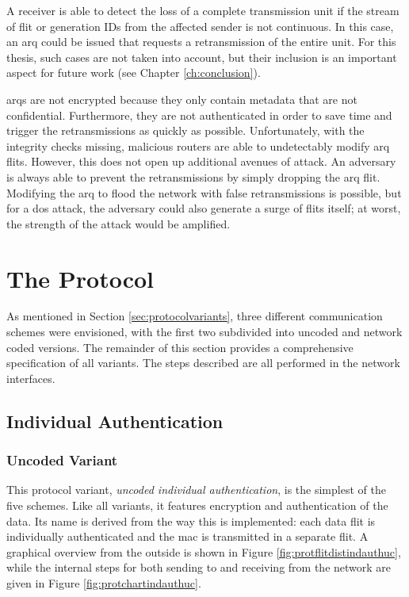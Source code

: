 A receiver is able to detect the loss of a complete transmission unit if the stream of flit or generation IDs from the affected sender is not
continuous. In this case, an \gls{arq} could be issued that requests a retransmission of the entire unit. For this thesis, such cases are not taken into
account, but their inclusion is an important aspect for future work (see Chapter \ref{ch:conclusion}).

\Glspl{arq} are not encrypted because they only contain metadata that are not confidential. Furthermore, they are not authenticated in order to save
time and trigger the retransmissions as quickly as possible. Unfortunately, with the integrity checks missing, malicious routers are able to undetectably
modify \gls{arq} flits. However, this does not open up additional avenues of attack. An adversary is always able to prevent the retransmissions
by simply dropping the \gls{arq} flit. Modifying the \gls{arq} to flood the network with false retransmissions is possible, but for a \gls{dos}
attack, the adversary could also generate a surge of flits itself; at worst, the strength of the attack would be amplified.

\section{The Protocol}\label{sec:theprotocol}
As mentioned in Section \ref{sec:protocolvariants}, three different communication schemes were envisioned, with the first two subdivided into uncoded
and network coded versions. The remainder of this section provides a comprehensive specification of all variants. The steps described are all
performed in the network interfaces.

\subsection{Individual Authentication}\label{subsec:indauth}
\subsubsection{Uncoded Variant}
This protocol variant, \textit{uncoded individual authentication}, is the simplest of the five schemes. Like all variants, it features encryption and
authentication of the data. Its name is derived from the way this is implemented: each data flit is individually authenticated and the \gls{mac} is
transmitted in a separate flit. A graphical overview from the outside is shown in Figure \vref{fig:protflitdistindauthuc}, while the internal steps for
both sending to and receiving from the network are given in Figure \vref{fig:protchartindauthuc}.

